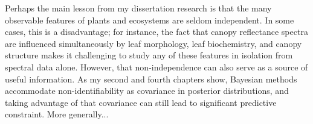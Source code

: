 


% 

Perhaps the main lesson from my dissertation research is that the many observable features of plants and ecosystems are seldom independent.
In some cases, this is a disadvantage;
for instance, the fact that canopy reflectance spectra are influenced simultaneously by leaf morphology, leaf biochemistry, and canopy structure makes it challenging to study any of these features in isolation from spectral data alone.
However, that non-independence can also serve as a source of useful information.
As my second and fourth chapters show, Bayesian methods accommodate non-identifiability as covariance in posterior distributions, and taking advantage of that covariance can still lead to significant predictive constraint.
More generally...
